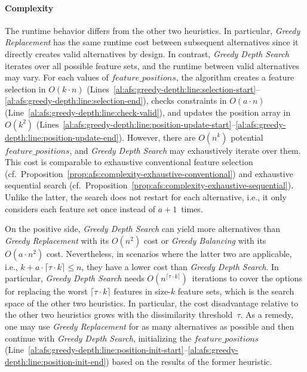 \documentclass{article}
\theoremstyle{definition}
\begin{document}
\paragraph{Complexity}

The runtime behavior differs from the other two heuristics.
In particular, \emph{Greedy Replacement} has the same runtime cost between subsequent alternatives since it directly creates valid alternatives by design.
In contrast, \emph{Greedy Depth Search} iterates over all possible feature sets, and the runtime between valid alternatives may vary.
For each values of $\mathit{feature\_positions}$, the algorithm creates a feature selection in $O(k \cdot n)$ (Lines~\ref{al:afs:greedy-depth:line:selection-start}--\ref{al:afs:greedy-depth:line:selection-end}), checks constraints in $O(a \cdot n)$ (Line~\ref{al:afs:greedy-depth:line:check-valid}), and updates the position array in~$O(k^2)$ (Lines~\ref{al:afs:greedy-depth:line:position-update-start}--\ref{al:afs:greedy-depth:line:position-update-end}).
However, there are $O(n^k)$ potential $\mathit{feature\_positions}$, and \emph{Greedy Depth Search} may exhaustively iterate over them.
This cost is comparable to exhaustive conventional feature selection (cf.~Proposition~\ref{prop:afs:complexity-exhaustive-conventional}) and exhaustive sequential search (cf.~Proposition~\ref{prop:afs:complexity-exhaustive-sequential}).
Unlike the latter, the search does not restart for each alternative, i.e., it only considers each feature set once instead of $a+1$~times.

On the positive side, \emph{Greedy Depth Search} can yield more alternatives than \emph{Greedy Replacement} with its $O(n^2)$ cost or \emph{Greedy Balancing} with its $O(a \cdot n^2)$ cost.
Nevertheless, in scenarios where the latter two are applicable, i.e., $k + a \cdot \lceil \tau \cdot k \rceil \leq n$, they have a lower cost than \emph{Greedy Depth Search}.
In particular, \emph{Greedy Depth Search} needs $O(n^{\lceil \tau \cdot k \rceil})$~iterations to cover the options for replacing the worst $\lceil \tau \cdot k \rceil$ features in size-$k$ feature sets, which is the search space of the other two heuristics.
In particular, the cost disadvantage relative to the other two heuristics grows with the dissimilarity threshold~$\tau$.
As a remedy, one may use \emph{Greedy Replacement} for as many alternatives as possible and then continue with \emph{Greedy Depth Search}, initializing the $\mathit{feature\_positions}$ (Line~\ref{al:afs:greedy-depth:line:position-init-start}--\ref{al:afs:greedy-depth:line:position-init-end}) based on the results of the former heuristic.
\end{document}
